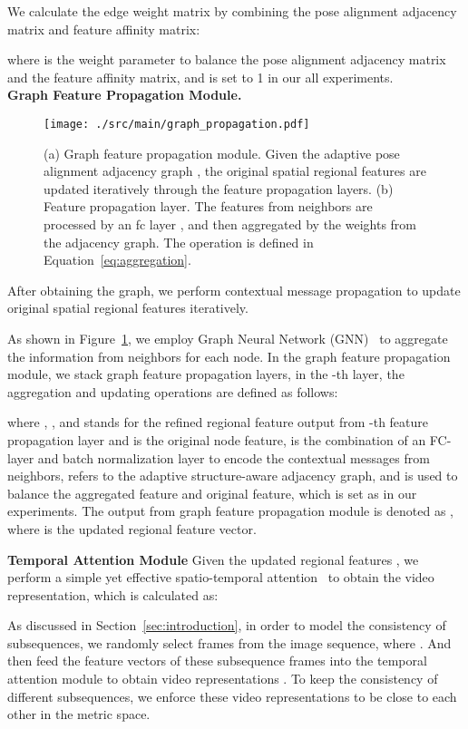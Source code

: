 \documentclass[journal]{IEEEtran}
\let\MYoriglatexcaption\caption
\renewcommand{\caption}[2][\relax]{\MYoriglatexcaption[#2]{#2}}
\begin{document}
We calculate the edge weight matrix  by combining the pose alignment adjacency matrix and feature affinity matrix:

where  is the weight parameter to balance the pose alignment adjacency matrix and the feature affinity matrix, and  is set to 1 in our all experiments.\\

\noindent\textbf{Graph Feature Propagation Module.}
\begin{figure}[t]
     \centering
     \texttt{[image: ./src/main/graph\_propagation.pdf]}
    \caption{(a) Graph feature propagation module. Given the adaptive pose alignment adjacency graph , the original spatial regional features are updated iteratively through the feature propagation layers. (b) Feature propagation layer. The features from neighbors are processed by an fc layer , and then aggregated by the weights from the adjacency graph. The operation is defined in Equation~\ref{eq:aggregation}.}
\label{fig:graph propagation}
\end{figure}
After obtaining the graph, we perform contextual message propagation to update original spatial regional features iteratively.

As shown in Figure~\ref{fig:graph propagation}, we employ Graph Neural Network (GNN)~\cite{Scarselli_2009_TNN} to aggregate the information from neighbors for each node. In the graph feature propagation module, we stack  graph feature propagation layers, in the -th layer, the aggregation and updating operations are defined as follows:

where , , and  stands for the refined regional feature output from -th feature propagation layer and  is the original node feature,  is the combination of an FC-layer and batch normalization layer to encode the contextual messages from neighbors,  refers to the adaptive structure-aware adjacency graph, and  is used to balance the aggregated feature and original feature, which is set as  in our experiments. The output from graph feature propagation module is denoted as , where  is the updated regional feature vector.

\noindent\textbf{Temporal Attention Module}\label{sec:temporal attention module}
Given the updated regional features , we perform a simple yet effective spatio-temporal attention~\cite{Fu_2019_AAAI} to obtain the video representation, which is calculated as:

As discussed in Section~\ref{sec:introduction}, in order to model the consistency of subsequences, we randomly select  frames from the image sequence, where . And then feed the feature vectors of these subsequence frames into the temporal attention module to obtain video representations . To keep the consistency of different subsequences, we enforce these video representations to be close to each other in the metric space.
\end{document}
